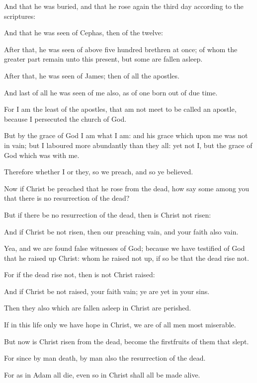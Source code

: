 {And
that he was
buried,
and
that he rose
again the
third
day according
to the
scriptures:

And
that he was
seen of
Cephas,
then of the
twelve:

After
that, he was
seen of
above five
hundred
brethren at
once;
of
whom the greater
part
remain
unto this
present,
but
some are fallen
asleep.

After
that, he was
seen of
James;
then of
all the
apostles.

And
last of
all he was
seen of me
also,
as of
one born out of due
time.

For
I
am the
least of the
apostles,
that
am
not
meet to be
called an
apostle,
because I
persecuted the
church of
God.

But by the
grace of
God I
am
what I
am:
and
his
grace which
{}
upon
me
was
not in
vain;
but I
laboured more
abundantly than
they
all:
yet
not
I,
but the
grace of
God which
was
with
me.

Therefore
whether
{}
I
or
they,
so we
preach,
and
so ye
believed.

Now
if
Christ be
preached
that he
rose
from the
dead,
how
say
some
among
you
that there
is
no
resurrection of the
dead?

But
if there
be
no
resurrection of the
dead,
then
is
Christ
not
risen:

And
if
Christ
be
not
risen,
then
{}
our
preaching
vain,
and
your
faith
{}
also
vain.

Yea,
and we are
found false
witnesses of
God;
because we have
testified
of
God
that he raised
up
Christ:
whom he
raised
not
up, if
so be
that the
dead
rise
not.

For
if the
dead
rise
not,
then
is
not
Christ
raised:

And
if
Christ
be
not
raised,
your
faith
{}
vain; ye
are
yet
in
your
sins.

Then
they
also which are fallen
asleep
in
Christ are
perished.

If
in
this
life
only we
have
hope
in
Christ, we
are of
all
men most
miserable.

But
now is
Christ
risen
from the
dead,
{}
become the
firstfruits of
them that
slept.

For
since
by
man
{}
death,
by
man
{}
also the
resurrection of the
dead.

For
as
in
Adam
all
die,
even
so
in
Christ
shall
all be made
alive.

}
